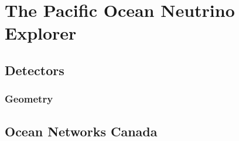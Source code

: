 \chapter{The Pacific Ocean Neutrino Explorer}

\section{Detectors}
\subsection{Geometry}
\section{Ocean Networks Canada}


